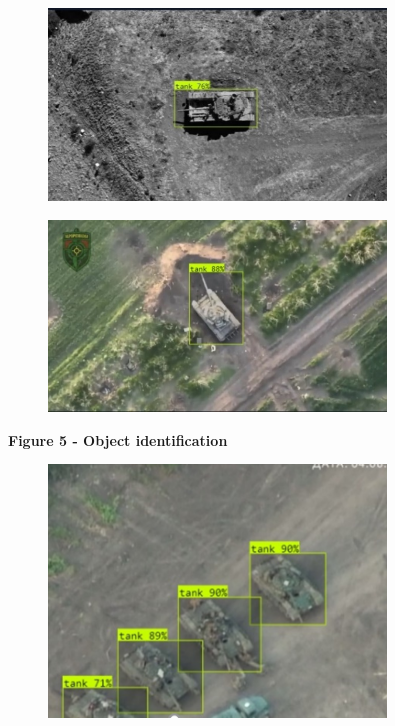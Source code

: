 \begin{figure}[H]
	\centering
	\includegraphics[width=0.8\textwidth]{assets/17}
	\caption*{}
\end{figure}\begin{figure}[H]
	\centering
	\includegraphics[width=0.8\textwidth]{assets/18}
	\caption*{}
\end{figure}

{\bfseries Figure 5 - Object identification}

\begin{figure}[H]
	\centering
	\includegraphics[width=0.8\textwidth]{assets/19}
	\caption*{}
\end{figure}

